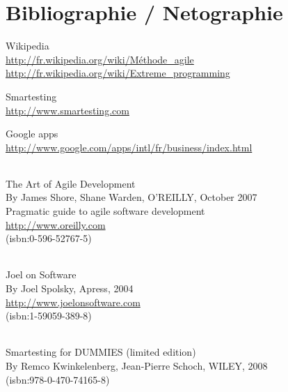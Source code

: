 \chapter{Bibliographie / Netographie}

Wikipedia\\
\url{http://fr.wikipedia.org/wiki/Méthode_agile}\\
\url{http://fr.wikipedia.org/wiki/Extreme_programming}

Smartesting\\
\url{http://www.smartesting.com}

Google apps\\
\url{http://www.google.com/apps/intl/fr/business/index.html}



\subparagraph*{}
The Art of Agile Development \\
By James Shore, Shane Warden, O'REILLY, October 2007\\
Pragmatic guide to agile software development\\
\url{http://www.oreilly.com}\\
(isbn:0-596-52767-5)

\subparagraph*{}
Joel on Software\\
By Joel Spolsky, Apress, 2004\\
\url{http://www.joelonsoftware.com}\\
(isbn:1-59059-389-8)

\subparagraph*{}
Smartesting for DUMMIES (limited edition)\\
By Remco Kwinkelenberg, Jean-Pierre Schoch, WILEY, 2008\\
(isbn:978-0-470-74165-8)
